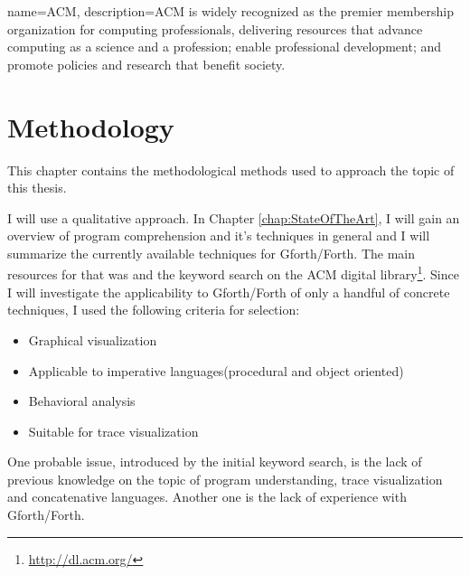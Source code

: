 {
  name={ACM},
  description={ACM is widely recognized as the premier membership organization for computing professionals, delivering resources that advance computing as a science and a profession; enable professional development; and promote policies and research that benefit society.}
}


\chapter{Methodology}
\label{chap:Methodology}

This chapter contains the methodological methods used to approach the topic of this thesis.

I will use a qualitative approach. In Chapter \ref{chap:StateOfTheArt}, I will gain an overview of program comprehension and it's techniques in general and I will summarize the currently available techniques for Gforth/Forth. The main resources for that was \cite{Cornelissen:2009:SSP:1638616.1639301} and the keyword search on the \gls{ACM} digital library\footnote{\url{http://dl.acm.org/}}.
Since I will investigate the applicability to Gforth/Forth of only a handful of concrete techniques, I used the following criteria for selection:
\begin{itemize}
\item Graphical visualization 
\item Applicable to imperative languages(procedural and object oriented)
\item Behavioral analysis
\item Suitable for trace visualization
\end{itemize}
One probable issue, introduced by the initial keyword search, is the lack of previous knowledge on the topic of program understanding, trace visualization and concatenative languages. Another one is the lack of experience with Gforth/Forth.

